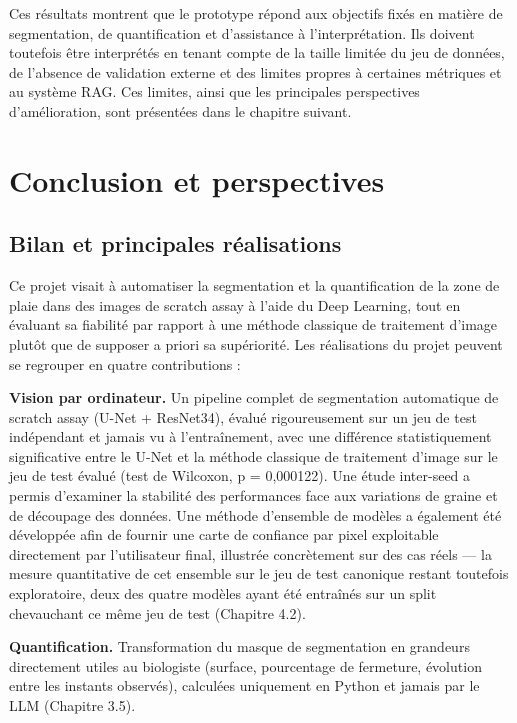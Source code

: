 \documentclass[12pt,a4paper]{report}
\begin{document}
Ces résultats montrent que le prototype répond aux objectifs fixés en matière de segmentation, de quantification et d'assistance à l'interprétation. Ils doivent toutefois être interprétés en tenant compte de la taille limitée du jeu de données, de l'absence de validation externe et des limites propres à certaines métriques et au système RAG. Ces limites, ainsi que les principales perspectives d'amélioration, sont présentées dans le chapitre suivant.

\chapter{Conclusion et perspectives}

\section{Bilan et principales réalisations}

Ce projet visait à automatiser la segmentation et la quantification de la zone de plaie dans des images de scratch assay à l'aide du Deep Learning, tout en évaluant sa fiabilité par rapport à une méthode classique de traitement d'image plutôt que de supposer a priori sa supériorité. Les réalisations du projet peuvent se regrouper en quatre contributions :

\textbf{Vision par ordinateur.} Un pipeline complet de segmentation automatique de scratch assay (U-Net + ResNet34), évalué rigoureusement sur un jeu de test indépendant et jamais vu à l'entraînement, avec une différence statistiquement significative entre le U-Net et la méthode classique de traitement d'image sur le jeu de test évalué (test de Wilcoxon, p = 0,000122). Une étude inter-seed a permis d'examiner la stabilité des performances face aux variations de graine et de découpage des données. Une méthode d'ensemble de modèles a également été développée afin de fournir une carte de confiance par pixel exploitable directement par l'utilisateur final, illustrée concrètement sur des cas réels --- la mesure quantitative de cet ensemble sur le jeu de test canonique restant toutefois exploratoire, deux des quatre modèles ayant été entraînés sur un split chevauchant ce même jeu de test (Chapitre 4.2).

\textbf{Quantification.} Transformation du masque de segmentation en grandeurs directement utiles au biologiste (surface, pourcentage de fermeture, évolution entre les instants observés), calculées uniquement en Python et jamais par le LLM (Chapitre 3.5).
\end{document}
